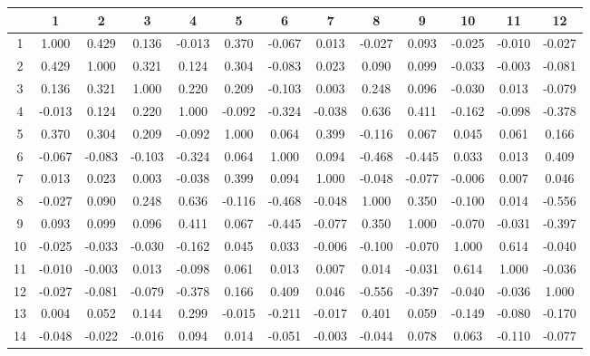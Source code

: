 \documentclass[ %
                    author={Sam Phippen},
                supervisor={Dr. Rafal Bogacz},
                     title={Real time voice activity detectors in noisy personal computing environments},
                  subtitle={},
                    degree={MEng},
                      year={2012} ]{thesis}
\begin{document}
\begin{table}
    \begin{tabular}{|c|c|c|c|c|c|c|c|c|c|c|c|c|}
        \hline
           & 1      & 2      & 3      & 4      & 5      & 6      & 7      & 8      & 9      & 10     & 11     & 12     \\ \hline
        1  & 1.000  & 0.429  & 0.136  & -0.013 & 0.370  & -0.067 & 0.013  & -0.027 & 0.093  & -0.025 & -0.010 & -0.027 \\ \hline
        2  & 0.429  & 1.000  & 0.321  & 0.124  & 0.304  & -0.083 & 0.023  & 0.090  & 0.099  & -0.033 & -0.003 & -0.081 \\ \hline
        3  & 0.136  & 0.321  & 1.000  & 0.220  & 0.209  & -0.103 & 0.003  & 0.248  & 0.096  & -0.030 & 0.013  & -0.079 \\ \hline
        4  & -0.013 & 0.124  & 0.220  & 1.000  & -0.092 & -0.324 & -0.038 & 0.636  & 0.411  & -0.162 & -0.098 & -0.378 \\ \hline
        5  & 0.370  & 0.304  & 0.209  & -0.092 & 1.000  & 0.064  & 0.399  & -0.116 & 0.067  & 0.045  & 0.061  & 0.166  \\ \hline
        6  & -0.067 & -0.083 & -0.103 & -0.324 & 0.064  & 1.000  & 0.094  & -0.468 & -0.445 & 0.033  & 0.013  & 0.409  \\ \hline
        7  & 0.013  & 0.023  & 0.003  & -0.038 & 0.399  & 0.094  & 1.000  & -0.048 & -0.077 & -0.006 & 0.007  & 0.046  \\ \hline
        8  & -0.027 & 0.090  & 0.248  & 0.636  & -0.116 & -0.468 & -0.048 & 1.000  & 0.350  & -0.100 & 0.014  & -0.556 \\ \hline
        9  & 0.093  & 0.099  & 0.096  & 0.411  & 0.067  & -0.445 & -0.077 & 0.350  & 1.000  & -0.070 & -0.031 & -0.397 \\ \hline
        10 & -0.025 & -0.033 & -0.030 & -0.162 & 0.045  & 0.033  & -0.006 & -0.100 & -0.070 & 1.000  & 0.614  & -0.040 \\ \hline
        11 & -0.010 & -0.003 & 0.013  & -0.098 & 0.061  & 0.013  & 0.007  & 0.014  & -0.031 & 0.614  & 1.000  & -0.036 \\ \hline
        12 & -0.027 & -0.081 & -0.079 & -0.378 & 0.166  & 0.409  & 0.046  & -0.556 & -0.397 & -0.040 & -0.036 & 1.000  \\ \hline
        13 & 0.004  & 0.052  & 0.144  & 0.299  & -0.015 & -0.211 & -0.017 & 0.401  & 0.059  & -0.149 & -0.080 & -0.170 \\ \hline
        14 & -0.048 & -0.022 & -0.016 & 0.094  & 0.014  & -0.051 & -0.003 & -0.044 & 0.078  & 0.063  & -0.110 & -0.077 \\ \hline

\end{tabular}
\end{table}
\end{document}
